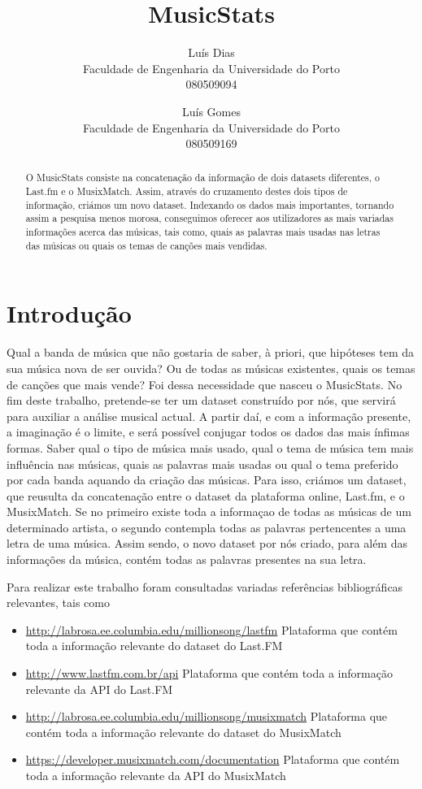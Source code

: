 \documentclass[twocolumn,twoside,10pt,a4paper]{article}
\title{MusicStats}
\author{Luís Dias\\Faculdade de Engenharia da Universidade do Porto\\080509094
\and
Luís Gomes\\Faculdade de Engenharia da Universidade do Porto\\080509169
}
\begin{document}
\maketitle

\begin{abstract}
O MusicStats consiste na concatenação da informação de dois datasets diferentes, o Last.fm e o MusixMatch.
Assim, através do cruzamento destes dois tipos de informação, criámos um novo dataset. Indexando os dados mais importantes, tornando assim a pesquisa menos morosa, conseguimos oferecer aos utilizadores as mais variadas informações acerca das músicas, tais como, quais as palavras mais usadas nas letras das músicas ou quais os temas de canções mais vendidas.
\end{abstract}

\section{Introdução}

Qual a banda de música que não gostaria de saber, à priori, que hipóteses tem da sua música nova de ser ouvida? Ou de todas as músicas existentes, quais os temas de canções que mais vende? Foi dessa necessidade que nasceu o MusicStats. No fim deste trabalho, pretende-se ter um dataset construído por nós, que servirá para auxiliar a análise musical actual. A partir daí, e com a informação presente, a imaginação é o limite, e será possível conjugar todos os dados das mais ínfimas formas. Saber qual o tipo de música mais usado, qual o tema de música tem mais influência nas músicas, quais as palavras mais usadas ou qual o tema preferido por cada banda aquando da criação das músicas. Para isso, criámos um dataset, que reusulta da concatenação entre o dataset da plataforma online, Last.fm, e o MusixMatch. Se no primeiro existe toda a informaçao de todas as músicas de um determinado artista, o segundo contempla todas as palavras pertencentes a uma letra de uma música. Assim sendo, o novo dataset por nós criado, para além das informações da música, contém todas as palavras presentes na sua letra.

Para realizar este trabalho foram consultadas variadas referências
bibliográficas relevantes, tais como
\begin{itemize}
\item \url{http://labrosa.ee.columbia.edu/millionsong/lastfm} Plataforma que contém toda a informação relevante do dataset do Last.FM
\item \url{http://www.lastfm.com.br/api} Plataforma que contém toda a informação relevante da API do Last.FM
\item \url{http://labrosa.ee.columbia.edu/millionsong/musixmatch} Plataforma que contém toda a informação relevante do dataset do MusixMatch
\item \url{https://developer.musixmatch.com/documentation} Plataforma que contém toda a informação relevante da API do MusixMatch
\end{itemize}
\end{document}

